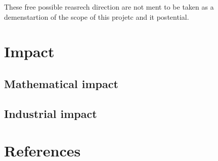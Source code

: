 \documentclass[11pt]{article}
\begin{document}
These free possible reasrech direction are not ment to be taken as a demenstartion of the scope of this projetc and it postential.



\section{Impact}

\subsection{Mathematical impact}

\subsection*{Industrial impact}
\subsection{}

\section{References}
\end{document}
